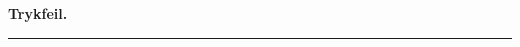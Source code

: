 \documentclass[12pt,a4paper]{book}
\newcommand{\streg}{\begin{center}\rule{2cm}{0.4pt}\end{center}}
\begin{document}
%
%

\clearpage

{\centering\large\textbf{Trykfeil.}\par}

\streg  %
\end{document}

